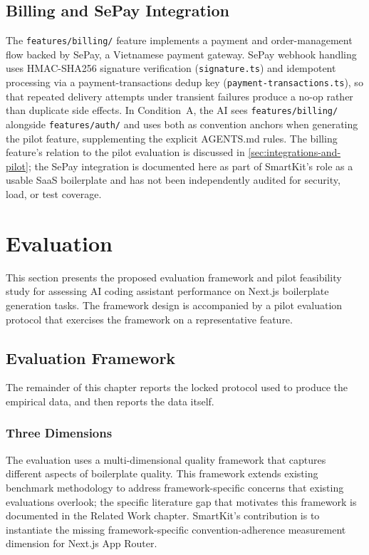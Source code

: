 \documentclass[12pt,a4paper]{report}
\DeclareRobustCommand{\filename}[1]{\bgroup\urlstyle{tt}\nolinkurl{#1}\egroup}
\begin{document}
\section{Billing and SePay Integration}
\label{sec:billing-sepay}

The \filename{features/billing/} feature implements a payment and order-management flow backed by SePay, a Vietnamese payment gateway. SePay webhook handling uses HMAC-SHA256 signature verification (\filename{signature.ts}) and idempotent processing via a payment-transactions dedup key (\filename{payment-transactions.ts}), so that repeated delivery attempts under transient failures produce a no-op rather than duplicate side effects. In Condition~A, the AI sees \filename{features/billing/} alongside \filename{features/auth/} and uses both as convention anchors when generating the pilot feature, supplementing the explicit AGENTS.md rules. The billing feature's relation to the pilot evaluation is discussed in \autoref{sec:integrations-and-pilot}; the SePay integration is documented here as part of SmartKit's role as a usable SaaS boilerplate and has not been independently audited for security, load, or test coverage.

\chapter{Evaluation}
\label{sec:evaluation}

This section presents the proposed evaluation framework and pilot feasibility study for assessing AI coding assistant performance on Next.js boilerplate generation tasks. The framework design is accompanied by a pilot evaluation protocol that exercises the framework on a representative feature.

\section{Evaluation Framework}
\label{sec:evaluation-framework}

The remainder of this chapter reports the locked protocol used to produce the empirical data, and then reports the data itself.

\subsection{Three Dimensions}
\label{sec:dimensions}

The evaluation uses a multi-dimensional quality framework that captures different aspects of boilerplate quality. This framework extends existing benchmark methodology to address framework-specific concerns that existing evaluations overlook; the specific literature gap that motivates this framework is documented in the Related Work chapter. SmartKit's contribution is to instantiate the missing framework-specific convention-adherence measurement dimension for Next.js App Router.
\end{document}
